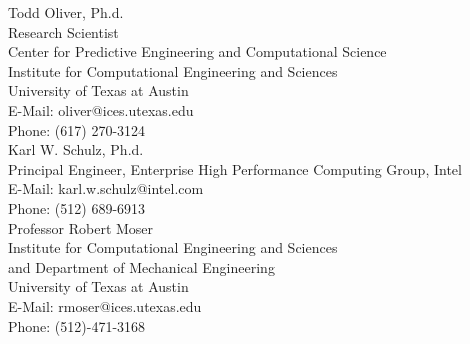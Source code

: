 


\noindent Todd Oliver, Ph.d. \\
Research Scientist \\
Center for Predictive Engineering and Computational Science \\
Institute for Computational Engineering and Sciences \\
University of Texas at Austin \\
E-Mail: oliver@ices.utexas.edu \\
Phone: (617) 270-3124 \\
\newline
\newline
Karl W. Schulz, Ph.d. \\
Principal Engineer, Enterprise High Performance Computing Group, Intel \\
E-Mail: karl.w.schulz@intel.com \\
Phone: (512) 689-6913 \\
\newline
\newline
\noindent Professor Robert Moser \\
Institute for Computational Engineering and Sciences \\
and Department of Mechanical Engineering \\
University of Texas at Austin \\
E-Mail: rmoser@ices.utexas.edu \\
\noindent Phone: (512)-471-3168 
